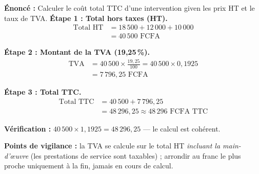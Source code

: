 \documentclass[11pt]{article}
\begin{document}
\begin{corrige}
\textbf{Énoncé :} Calculer le coût total TTC d'une intervention given les prix HT et le taux de TVA.
\tcblower
\textbf{Étape 1 : Total hors taxes (HT).}
\begin{align*}
\text{Total HT} &= 18\,500 + 12\,000 + 10\,000 \\
&= 40\,500 \text{ FCFA}
\end{align*}

\textbf{Étape 2 : Montant de la TVA (19,25\,\%).}
\begin{align*}
\text{TVA} &= 40\,500 \times \frac{19,25}{100} = 40\,500 \times 0{,}1925 \\
&= 7\,796{,}25 \text{ FCFA}
\end{align*}

\textbf{Étape 3 : Total TTC.}
\begin{align*}
\text{Total TTC} &= 40\,500 + 7\,796{,}25 \\
&= 48\,296{,}25 \approx \boxed{48\,296 \text{ FCFA TTC}}
\end{align*}

\textbf{Vérification :} $40\,500 \times 1{,}1925 = 48\,296{,}25$ — le calcul est cohérent.

\textbf{Points de vigilance :} la TVA se calcule sur le total HT \emph{incluant la main-d'œuvre} (les prestations de service sont taxables) ; arrondir au franc le plus proche uniquement à la fin, jamais en cours de calcul.
\end{corrige}
\end{document}
